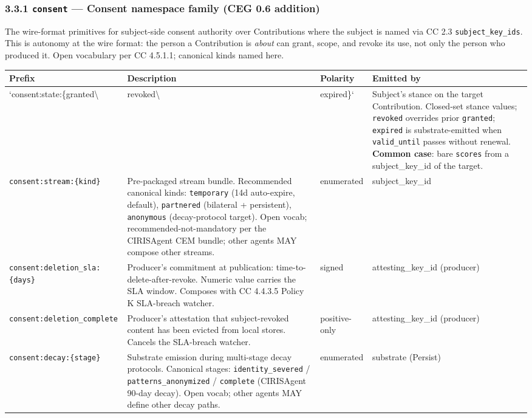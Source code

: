 \documentclass[11pt]{article}
\begin{document}
\subsubsection*{3.3.1 \texttt{consent} — Consent namespace family (CEG 0.6 addition)}


The wire-format primitives for subject-side consent authority over Contributions where the subject is named via CC 2.3 \texttt{subject\_key\_ids}. This is autonomy at the wire format: the person a Contribution is \textit{about} can grant, scope, and revoke its use, not only the person who produced it. Open vocabulary per CC 4.5.1.1; canonical kinds named here.


{\scriptsize
\begin{longtable}{|p{4.0cm}|p{4.0cm}|p{4.0cm}|p{4.0cm}|}\hline
\textbf{Prefix} & \textbf{Description} & \textbf{Polarity} & \textbf{Emitted by} \\ \hline\endhead
`consent:state:\{granted\textbackslash{} & revoked\textbackslash{} & expired\}` & Subject's stance on the target Contribution. Closed-set stance values; \texttt{revoked} overrides prior \texttt{granted}; \texttt{expired} is substrate-emitted when \texttt{valid\_until} passes without renewal. \textbf{Common case}: bare \texttt{scores} from a subject\_key\_id of the target. \\ \hline
\texttt{consent:stream:\{kind\}} & Pre-packaged stream bundle. Recommended canonical kinds: \texttt{temporary} (14d auto-expire, default), \texttt{partnered} (bilateral + persistent), \texttt{anonymous} (decay-protocol target). Open vocab; recommended-not-mandatory per the CIRISAgent CEM bundle; other agents MAY compose other streams. & enumerated & subject\_key\_id \\ \hline
\texttt{consent:deletion\_sla:\{days\}} & Producer's commitment at publication: time-to-delete-after-revoke. Numeric value carries the SLA window. Composes with CC 4.4.3.5 Policy K SLA-breach watcher. & signed & attesting\_key\_id (producer) \\ \hline
\texttt{consent:deletion\_complete} & Producer's attestation that subject-revoked content has been evicted from local stores. Cancels the SLA-breach watcher. & positive-only & attesting\_key\_id (producer) \\ \hline
\texttt{consent:decay:\{stage\}} & Substrate emission during multi-stage decay protocols. Canonical stages: \texttt{identity\_severed} / \texttt{patterns\_anonymized} / \texttt{complete} (CIRISAgent 90-day decay). Open vocab; other agents MAY define other decay paths. & enumerated & substrate (Persist) \\ \hline

\end{longtable}}
\end{document}
